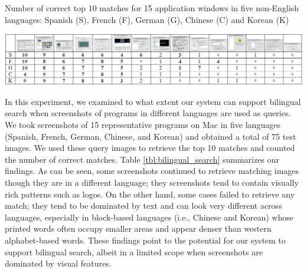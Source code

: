 \documentclass{www2010-submission}
\begin{document}
\begin{table}
  \caption{Number of correct top 10 matches for 15 application windows 
    in five non-English
    languages: Spanish (S), French (F), German (G), Chinese (C) and
    Korean (K)}
\vspace{0.1in}
\includegraphics[width=2\columnwidth]{figure/bilingual_search.png}
\label{tbl:bilingual_search}
\end{table}

In this experiment, we examined to what extent our system can support
bilingual search when screenshots of programs in different languages
are used as queries. We took screenshots of 15 representative
programs on Mac in five languages (Spanish, French, German,
Chinese, and Korean) and obtained a total of 75 test
images.  We used these query images to retrieve the top 
10 matches and counted the number of correct matches. 
Table \ref{tbl:bilingual_search} summarizes
our findings. As can be seen, some screenshots continued to retrieve 
matching images though they are in a different language; they screenshots tend 
to contain visually rich patterns such as logos. On the other
hand, some cases failed to retrieve any match; they tend to be
dominated by text and can look very different across languages,
especially in block-based languages (i.e., Chinese and Korean) whose
printed words often occupy smaller areas and appear denser than
western alphabet-based words. These findings point to the potential
for our system to support bilingual search, albeit in a limited
scope when screenshots are dominated by visual features. 





\end{document}
